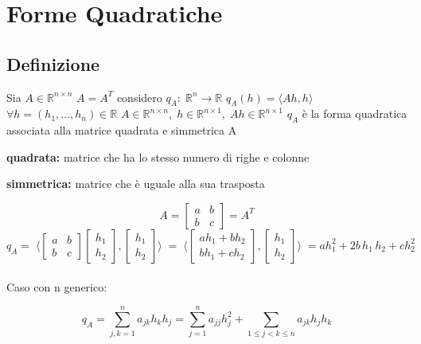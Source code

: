 \documentclass[12pt]{article}
\newcommand {\R}{\mathbb{R}}
\begin{document}
\section{Forme Quadratiche}

\subsection{Definizione}

Sia $A\in \R ^ {n\times n}$ $A=A^T$ considero $q_A:\; \R^n \rightarrow \R $ $q_A(h) = \langle Ah, h\rangle$\newline
$\forall h = (h_1,\dots, h_n)\in \R$ \qquad $A\in \R^{n\times n},\;h\in \R^{n\times 1},\; Ah\in \R^{n\times 1}$\newline
$q_A$ è la forma quadratica associata alla matrice quadrata e simmetrica A

\textbf{quadrata:} matrice che ha lo stesso numero di righe e colonne

\textbf{simmetrica:} matrice che è uguale alla sua trasposta


$$
    A =
    \begin{bmatrix}
        a & b \\
        b & c
    \end{bmatrix}
    = A^T
$$
$$
    q_A = \;\langle
    \begin{bmatrix}
        a & b \\
        b & c
    \end{bmatrix}
    \begin{bmatrix}
        h_1 \\
        h_2
    \end{bmatrix},
    \begin{bmatrix}
        h_1 \\
        h_2
    \end{bmatrix}
    \rangle\; = \;\langle
    \begin{bmatrix}
        ah_1 + bh_2 \\
        bh_1 + ch_2
    \end{bmatrix},
    \begin{bmatrix}
        h_1 \\
        h_2
    \end{bmatrix}
    \rangle\; = ah_1^2+2b\,h_1\,h_2+ch_2^2
$$
\\Caso con n generico:

$$
    q_A = \sum_{j,k = 1}^{n} a_{jk} h_k h_j = \sum_{j = 1}^{n} a_{jj} h_j^2 + \sum_{1\leq j < k\leq n} a_{jk}h_jh_k
$$
\end{document}
